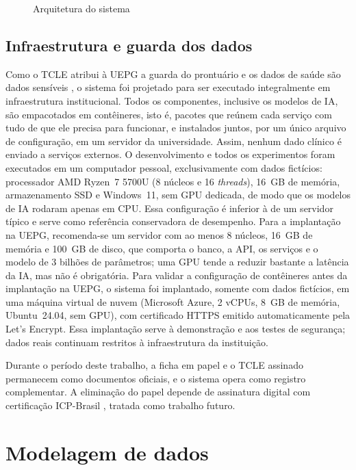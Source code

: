 \begin{figure}[htbp]
	\caption{Arquitetura do sistema}
	\label{fig:arquitetura}
	\centering
	\resizebox{\textwidth}{!}{}
\end{figure}

\subsection{Infraestrutura e guarda dos dados}

Como o TCLE atribui à UEPG a guarda do prontuário e os dados de saúde são dados sensíveis \cite{lgpd2018}, o sistema foi projetado para ser executado integralmente em infraestrutura institucional. Todos os componentes, inclusive os modelos de IA, são empacotados em contêineres, isto é, pacotes que reúnem cada serviço com tudo de que ele precisa para funcionar, e instalados juntos, por um único arquivo de configuração, em um servidor da universidade. Assim, nenhum dado clínico é enviado a serviços externos. O desenvolvimento e todos os experimentos foram executados em um computador pessoal, exclusivamente com dados fictícios: processador AMD Ryzen~7 5700U (8 núcleos e 16 \textit{threads}), 16~GB de memória, armazenamento SSD e Windows~11, sem GPU dedicada, de modo que os modelos de IA rodaram apenas em CPU. Essa configuração é inferior à de um servidor típico e serve como referência conservadora de desempenho. Para a implantação na UEPG, recomenda-se um servidor com ao menos 8 núcleos, 16~GB de memória e 100~GB de disco, que comporta o banco, a API, os serviços e o modelo de 3 bilhões de parâmetros; uma GPU tende a reduzir bastante a latência da IA, mas não é obrigatória. Para validar a configuração de contêineres antes da implantação na UEPG, o sistema foi implantado, somente com dados fictícios, em uma máquina virtual de nuvem (Microsoft Azure, 2 vCPUs, 8~GB de memória, Ubuntu~24.04, sem GPU), com certificado HTTPS emitido automaticamente pela Let's Encrypt. Essa implantação serve à demonstração e aos testes de segurança; dados reais continuam restritos à infraestrutura da instituição.

Durante o período deste trabalho, a ficha em papel e o TCLE assinado permanecem como documentos oficiais, e o sistema opera como registro complementar. A eliminação do papel depende de assinatura digital com certificação ICP-Brasil \cite{cfo91-2009}, tratada como trabalho futuro.

\section{Modelagem de dados}
\label{sec:modelagem}

